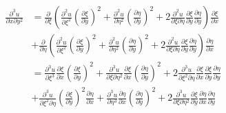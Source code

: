\documentclass[twoside, 11pt, a4paper]{article}
\begin{document}
\[
  \begin{split}
    \frac{\partial^3u}{\partial x\partial y^2} &= \frac{\partial}{\partial\xi}\left(\frac{\partial^2 u}{\partial\xi^2}\left(\frac{\partial\xi}{\partial y}\right)^2 + \frac{\partial^2u}{\partial\eta^2}\left(\frac{\partial\eta}{\partial y}\right)^2 + 2\frac{\partial^2u}{\partial\xi\partial\eta}\frac{\partial\xi}{\partial y}\frac{\partial\eta}{\partial y}\right)\frac{\partial\xi}{\partial x} \\
       &+\frac{\partial}{\partial\eta}\left(\frac{\partial^2 u}{\partial\xi^2}\left(\frac{\partial\xi}{\partial y}\right)^2 + \frac{\partial^2u}{\partial\eta^2}\left(\frac{\partial\eta}{\partial y}\right)^2 + 2\frac{\partial^2u}{\partial\xi\partial\eta}\frac{\partial\xi}{\partial y}\frac{\partial\eta}{\partial y}\right)\frac{\partial\eta}{\partial x} \\
       &= \frac{\partial^3u}{\partial\xi^3}\frac{\partial\xi}{\partial x}\left(\frac{\partial\xi}{\partial y}\right)^2 + \frac{\partial^3u}{\partial\xi\partial\eta^2}\frac{\partial \xi}{\partial x}\left(\frac{\partial\eta}{\partial y}\right)^2 + 2\frac{\partial^3u}{\partial\xi^2\partial\eta}\frac{\partial\xi}{\partial x}\frac{\partial\xi}{\partial y}\frac{\partial\eta}{\partial y} \\
       &+ \frac{\partial^3u}{\partial\xi^2\partial\eta}\left(\frac{\partial\xi}{\partial y}\right)^2\frac{\partial\eta}{\partial x} + \frac{\partial^3u}{\partial\eta^3}\frac{\partial\eta}{\partial x}\left(\frac{\partial\eta}{\partial y}\right)^2 + 2\frac{\partial^3u}{\partial\xi\partial\eta^2}\frac{\partial\xi}{\partial y}\frac{\partial\eta}{\partial x}\frac{\partial\eta}{\partial y}
  \end{split}
\]
\end{document}
